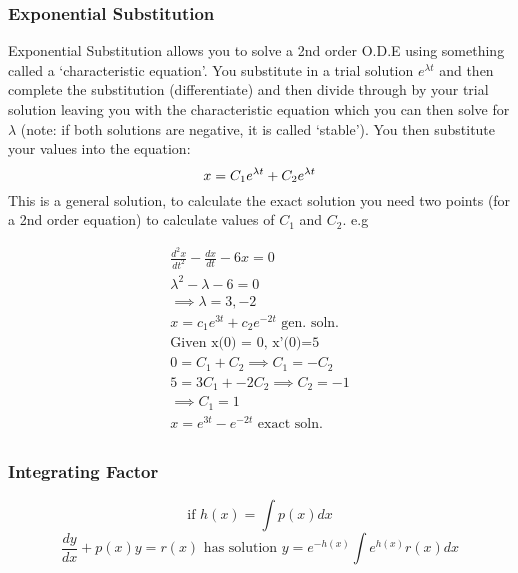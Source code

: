 \documentclass[12pt] {article}
\begin{document}
\subsubsection*{Exponential Substitution}
Exponential Substitution allows you to solve a 2nd order O.D.E using something called
a `characteristic equation'. You substitute in a trial solution $e^{\lambda t}$
and then complete the substitution (differentiate) and then divide through by your 
trial solution leaving you with the characteristic equation which you can then solve for
$\lambda$ (note: if both solutions are negative, it is called `stable'). You then substitute your values into the equation:
\begin{equation*}
  x=C_1e^{\lambda t} + C_2e^{\lambda t} \\
\end{equation*}
This is a general solution, to calculate the exact solution you need two points 
(for a 2nd order equation) to calculate values of $C_1$ and $C_2$. e.g
\begin{example}
\begin{gather*}
  \frac{d^2x}{dt^2} - \frac{dx}{dt} -6x =0 \\
  \lambda^2 - \lambda - 6 = 0\\
  \implies \lambda=3,-2 \\
  x=c_1e^{3t} + c_2e^{-2t} \text{ gen. soln.} \\
  \text{Given x(0) = 0, x'(0)=5} \\
  0 = C_1 + C_2 \implies C_1 = -C_2 \\
  5 = 3C_1 + -2C_2 \implies C_2 = -1 \\
  \implies C_1 = 1 \\
  x=e^{3t} - e^{-2t} \text{ exact soln.} \\
\end{gather*}
\end{example}

\subsubsection*{Integrating Factor}
\begin{equation*}
\text{if } h(x)=\int p(x)dx
\end{equation*}
\begin{equation*}
  \frac{dy}{dx} + p(x)y = r(x) \text{ has solution } y = e^{-h(x)} \int e^{h(x)}r(x)dx
\end{equation*}

\newpage
\end{document}
